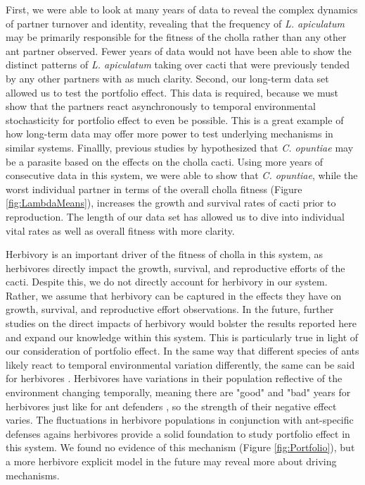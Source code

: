 \documentclass[11pt]{article}
\begin{document}
First, we were able to look at many years of data to reveal the complex dynamics of partner turnover and identity, revealing that the frequency of \textit{L. apiculatum} may be primarily responsible for the fitness of the cholla rather than any other ant partner observed.
Fewer years of data would not have been able to show the distinct patterns of \textit{L. apiculatum} taking over cacti that were previously tended by any other partners with as much clarity.
Second, our long-term data set allowed us to test the portfolio effect.
This data is required, because we must show that the partners react asynchronously to temporal environmental stochasticity for portfolio effect to even be possible.
This is a great example of how long-term data may offer more power to test underlying mechanisms in similar systems.
Finallly, previous studies by \cite{Miller2007} hypothesized that \textit{C. opuntiae} may be a parasite based on the effects on the cholla cacti.
Using more years of consecutive data in this system, we were able to show that \textit{C. opuntiae}, while the worst individual partner in terms of the overall cholla fitness (Figure \ref{fig:LambdaMeans}), increases the growth and survival rates of cacti prior to reproduction.
The length of our data set has allowed us to dive into individual vital rates as well as overall fitness with more clarity.


Herbivory is an important driver of the fitness of cholla in this system, as herbivores directly impact the growth, survival, and reproductive efforts of the cacti.
Despite this, we do not directly account for herbivory in our system. 
Rather, we assume that herbivory can be captured in the effects they have on growth, survival, and reproductive effort observations.
In the future, further studies on the direct impacts of herbivory would bolster the results reported here and expand our knowledge within this system.
This is particularly true in light of our consideration of portfolio effect. 
In the same way that different species of ants likely react to temporal environmental variation differently, the same can be said for herbivores \citep{Thibaut2012}.
Herbivores have variations in their population reflective of the environment changing temporally, meaning there are "good" and "bad" years for herbivores just like for ant defenders \citep{Batstone2018}, so the strength of their negative effect varies. 
The fluctuations in herbivore populations in conjunction with ant-specific defenses agains herbivores provide a solid foundation to study portfolio effect in this system. 
We found no evidence of this mechanism (Figure \ref{fig:Portfolio}), but a more herbivore explicit model in the future may reveal more about driving mechanisms. 
\end{document}
